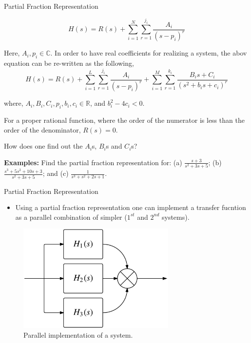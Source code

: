 \documentclass{beamer}
\begin{document}
\begin{frame}{Partial Fraction Representation}

\[ H(s) = R(s) + \sum_{i=1}^{N}\sum_{r=1}^{j_i}\frac{A_i}{\left(s-p_i\right)^r} \]

Here, $A_i, p_i \in \mathbb{C}$. In order to have real coefficients for realizing a system, the abov equation can be re-written as the following,
\[ H(s) = R(s) + \sum_{i=1}^{L}\sum_{r=1}^{j_i}\frac{A_i}{\left(s-p_i\right)^r} + \sum_{i=1}^{M}\sum_{r=1}^{k_i}\frac{B_is + C_i}{\left(s^2+b_is+c_i\right)^r}\]

where, $A_i, B_i, C_i, p_i, b_i, c_i \in \mathbb{R}$, and $b_i^2-4c_i < 0$. 

For a proper rational function, where the order of the numerator is less than the order of the denominator, $R(s) = 0$.

\vspace{2mm}
How does one find out the $A_i$s, $B_i$s and $C_i$s?
\vspace{2mm}

\textbf{Examples:} Find the partial fraction representation for: (a) $\frac{s+3}{s^2+3s+5}$; (b) $\frac{s^3+5s^2+10s+3}{s^2+3s+5}$; and (c) $\frac{1}{s^3+s^2+2s+1}$.
\end{frame}

\begin{frame}{Partial Fraction Representation}

\begin{itemize}
\item Using a partial fraction representation one can implement a transfer fucntion as a parallel combination of simpler ($1^{st}$ and $2^{nd}$ systems).
\end{itemize}
\vspace{-8mm}
\begin{figure}
\centering
\caption{\tiny{Parallel implementation of a system.}}
\includegraphics[width=0.7\textwidth]{img/parallel.png}
\end{figure}
\end{frame}
\end{document}

